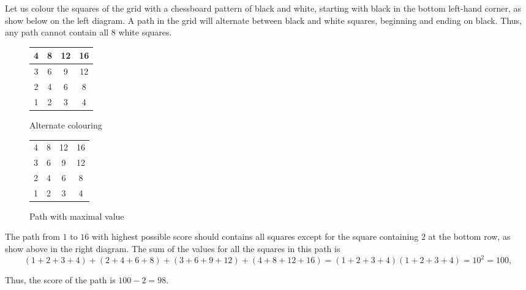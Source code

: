 \documentclass{article}
\begin{document}
\begin{soln}
    Let us colour the squares of the grid with a chessboard pattern of black and white,
    starting with black in the bottom left-hand corner, as show below on the left diagram.
    A path in the grid will alternate between black and white squares,
    beginning and ending on black.
    Thus, any path cannot contain all $8$ white squares.

    \begin{figure}[h]
        \centering
        \begin{minipage}[t]{7cm}
            \centering
            \begin{tabular}{|c|c|c|c|}
                \hline
                4                         & \cellcolor[HTML]{C0C0C0}8 & 12                        & \cellcolor[HTML]{C0C0C0}16 \\ \hline
                \cellcolor[HTML]{C0C0C0}3 & 6                         & \cellcolor[HTML]{C0C0C0}9 & 12                         \\ \hline
                2                         & \cellcolor[HTML]{C0C0C0}4 & 6                         & \cellcolor[HTML]{C0C0C0}8  \\ \hline
                \cellcolor[HTML]{C0C0C0}1 & 2                         & \cellcolor[HTML]{C0C0C0}3 & 4                          \\ \hline
            \end{tabular}
            \caption{Alternate colouring}
        \end{minipage}
        \quad
        \begin{minipage}[t]{6cm}
            \centering
            \begin{tabular}{|cccc|}
                \hline
                4                       & 8                      & 12                     & 16 \\ \cline{2-4} 
                3                       & 6                      & 9                      & 12 \\ \cline{1-3}
                2                       & 4                      & \multicolumn{1}{c|}{6} & 8  \\ \cline{2-2}
                \multicolumn{1}{|c|}{1} & \multicolumn{1}{c|}{2} & 3                      & 4  \\ \hline
                \end{tabular}
            \caption{Path with maximal value}
        \end{minipage}     
    \end{figure}

    The path from $1$ to $16$ with highest possible score should contains all squares
    except for the square containing $2$ at the bottom row, as show above in the right diagram.
    The sum of the values for all the squares in this path is 
    \[ 
        (1+2+3+4)+(2+4+6+8)+(3+6+9+12)+(4+8+12+16) = (1+2+3+4)(1+2+3+4) = 10^2 = 100,
    \]
    
    Thus, the score of the path is $100-2=\boxed{98}.$
\end{soln}
\end{document}
